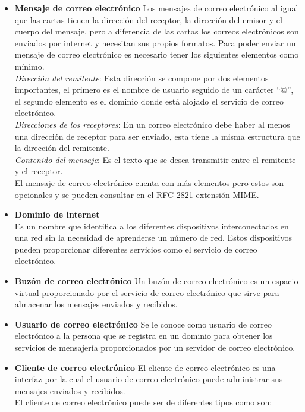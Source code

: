 \begin{itemize}
\item \textbf{Mensaje de correo electrónico}
Los  mensajes  de  correo  electrónico  al  igual  que  las  cartas  tienen  la  dirección  del receptor, la dirección del emisor y el cuerpo del mensaje, pero a diferencia de las cartas 
los correos electrónicos son enviados por internet y necesitan sus propios formatos. Para  poder  enviar  un  mensaje  de  correo  electrónico  es  necesario  tener  los siguientes  elementos 
como mínimo.\\ 
\textit{Dirección  del  remitente}:  Esta  dirección  se  compone  por  dos  elementos  importantes,  el primero es el nombre de usuario seguido de un carácter “@”, el segundo elemento es 
el dominio donde está alojado el servicio de correo electrónico.\\ 
\textit{Direcciones  de  los  receptores}:  En  un  correo  electrónico  debe  haber  al  menos  una dirección  de  receptor  para  ser  enviado,  esta    tiene  la  misma estructura que la dirección del remitente.     \\  
\textit{Contenido  del  mensaje}:  Es  el  texto  que  se  desea  transmitir entre  el  remitente  y  el receptor. \\ 
El mensaje de correo electrónico cuenta con más elementos pero estos son opcionales y se pueden consultar en el RFC 2821 extensión MIME.\cite{rfc2821}
\item \textbf{Dominio de internet}\\
Es un nombre que identifica a los diferentes dispositivos interconectados en una red sin la  necesidad  de  aprenderse  un  número  de  red.  Estos  dispositivos  pueden  proporcionar 
diferentes servicios como el servicio de correo electrónico. 
\item \textbf{Buzón de correo electrónico}
Un  buzón  de  correo  electrónico  es  un  espacio  virtual  proporcionado  por  el  servicio  de correo electrónico que sirve para almacenar los mensajes enviados y recibidos. 
\item \textbf{Usuario de correo electrónico}
Se  le  conoce  como  usuario  de  correo  electrónico  a  la  persona  que  se  registra  en  un dominio  para  obtener  los  servicios  de  mensajería  proporcionados  por  un  servidor  de correo electrónico. 
\item \textbf{Cliente de correo electrónico}
El  cliente  de  correo  electrónico  es  una  interfaz  por  la  cual  el  usuario  de  correo  electrónico puede administrar sus mensajes enviados y recibidos. \\
El cliente de correo electrónico puede ser de diferentes tipos como son: 


\end{itemize}
